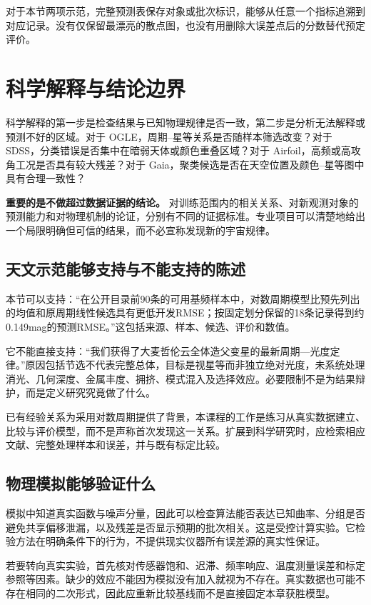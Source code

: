 对于本节两项示范，完整预测表保存对象或批次标识，能够从任意一个指标追溯到对应记录。没有仅保留最漂亮的散点图，也没有用删除大误差点后的分数替代预定评价。

\section{科学解释与结论边界}
科学解释的第一步是检查结果与已知物理规律是否一致，第二步是分析无法解释或预测不好的区域。对于 OGLE，周期--星等关系是否随样本筛选改变？对于 SDSS，分类错误是否集中在暗弱天体或颜色重叠区域？对于 Airfoil，高频或高攻角工况是否具有较大残差？对于 Gaia，聚类候选是否在天空位置及颜色--星等图中具有合理一致性？

\textbf{重要的是不做超过数据证据的结论。} 对训练范围内的相关关系、对新观测对象的预测能力和对物理机制的论证，分别有不同的证据标准。专业项目可以清楚地给出一个局限明确但可信的结果，而不必宣称发现新的宇宙规律。

\subsection{天文示范能够支持与不能支持的陈述}
本节可以支持：“在公开目录前90条的可用基频样本中，对数周期模型比预先列出的均值和原周期线性候选具有更低开发RMSE；按固定划分保留的18条记录得到约0.149mag的预测RMSE。”这包括来源、样本、候选、评价和数值。

它不能直接支持：“我们获得了大麦哲伦云全体造父变星的最新周期—光度定律。”原因包括节选不代表完整总体，目标是视星等而非独立绝对光度，未系统处理消光、几何深度、金属丰度、拥挤、模式混入及选择效应。必要限制不是为结果辩护，而是定义研究究竟做了什么。

已有经验关系为采用对数周期提供了背景，本课程的工作是练习从真实数据建立、比较与评价模型，而不是声称首次发现这一关系。扩展到科学研究时，应检索相应文献、完整处理样本和误差，并与既有标定比较。

\subsection{物理模拟能够验证什么}
模拟中知道真实函数与噪声分量，因此可以检查算法能否表达已知曲率、分组是否避免共享偏移泄漏，以及残差是否显示预期的批次相关。这是受控计算实验。它检验方法在明确条件下的行为，不提供现实仪器所有误差源的真实性保证。

若要转向真实实验，首先核对传感器饱和、迟滞、频率响应、温度测量误差和标定参照等因素。缺少的效应不能因为模拟没有加入就视为不存在。真实数据也可能不存在相同的二次形式，因此应重新比较基线而不是直接固定本章获胜模型。

